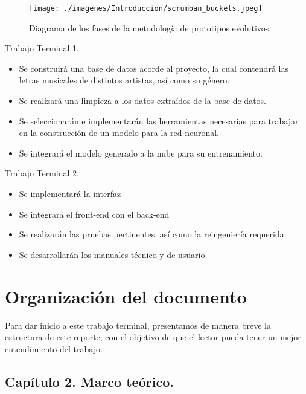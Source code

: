 \documentclass[12pt, a4paper, titlepage]{report}
\begin{document}
	    \begin{figure}[H]
	    	\begin{center}	                      \texttt{[image: ./imagenes/Introduccion/scrumban\_buckets.jpeg]}
	    		\caption[Fases de la metodología por prototipos]{Diagrama de los fases de la metodología de prototipos evolutivos.}
	    		\label{fig:metodologia}
	    	\end{center}
	    \end{figure}
	    
	    Trabajo Terminal 1.
	    \begin{itemize}
	    	\item Se construirá una base de datos acorde al proyecto, la cual contendr\'a las letras musicales de distintos artistas, as\'i como su g\'enero.
	    	\item Se realizar\'a una limpieza a los datos extra\'idos de la base de datos.
	    	\item Se seleccionar\'an e implementar\'an las herramientas necesarias para trabajar en la construcci\'on de un modelo para la red neuronal.
	    	\item Se integrar\'a el modelo generado a la nube para su entrenamiento.
	    \end{itemize}
	    Trabajo Terminal 2.        
	    \begin{itemize}
	    	\item Se implementar\'a la interfaz
	    	\item Se integrar\'a el front-end con el back-end
	    	\item Se realizar\'an las pruebas pertinentes, as\'i como la reingenier\'ia requerida. 
	    	\item Se desarrollar\'an los manuales t\'ecnico y de usuario.
	    \end{itemize}
    
        \section{Organización del documento}
            Para dar inicio a este trabajo terminal, presentamos de manera breve la estructura de este reporte, con el objetivo de que el lector pueda tener un mejor entendimiento del trabajo.
            

            \subsection{Capítulo 2. Marco teórico.}
                \lipsum[4]
             
\end{document}
